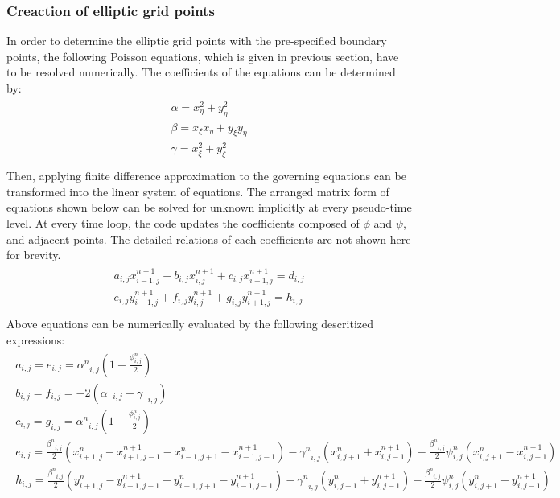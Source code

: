 \documentclass[letterpaper,10pt,english]{sphinxmanual}
\begin{document}
\subsubsection{Creaction of elliptic grid points}
\label{\detokenize{devel:creaction-of-elliptic-grid-points}}
In order to determine the elliptic grid points with the pre-specified boundary points, the following Poisson equations, which is given in previous  section, have to be resolved numerically. The coefficients of the equations can be determined by:
\begin{align*}\!\begin{aligned}
{\alpha}=x_{\eta}^{2} + y_{\eta}^{2}\\
{\beta}=x_{\xi}x_{\eta} + y_{\xi}y_{\eta}\\
{\gamma}=x_{\xi}^{2} + y_{\xi}^{2}\\
\end{aligned}\end{align*}
Then, applying finite difference approximation to the governing equations can be transformed into the linear system of equations. The arranged matrix form of equations shown below can be solved for unknown implicitly at every pseudo-time level. At every time loop, the code updates the coefficients composed of \(\phi\) and \(\psi\), and adjacent points. The detailed relations of each coefficients are not shown here for brevity.
\begin{align*}\!\begin{aligned}
a_{i,j} x_{i-1,j}^{n+1} + b_{i,j} x_{i,j}^{n+1} + c_{i,j} x_{i+1,j}^{n+1} = d_{i,j}\\
e_{i,j} y_{i-1,j}^{n+1} + f_{i,j} y_{i,j}^{n+1} + g_{i,j} y_{i+1,j}^{n+1} = h_{i,j}\\
\end{aligned}\end{align*}
Above equations can be numerically evaluated by the following descritized expressions:
\begin{align*}\!\begin{aligned}
a_{i,j} = e_{i,j} = {\alpha}_{\text{ }i,j}^{n}  \left(1 - \frac{\phi_{i,j}^{n}}{2} \right)\\
b_{i,j} = f_{i,j} = -2 \left({\alpha}_{\text{ }i,j} + {\gamma}_{\text{ }i,j} \right)\\
c_{i,j} = g_{i,j} = {\alpha}_{\text{ }i,j}^{n}  \left(1 + \frac{\phi_{i,j}^{n}}{2} \right)\\
e_{i,j} = \frac{{\beta}_{\text{ }i,j}^{n}}{2} \left(x_{i+1,j}^{n} - x_{i+1,j-1}^{n+1} - x_{i-1,j+1}^{n} - x_{i-1,j-1}^{n+1} \right) - {\gamma}_{\text{ }i,j}^{n} \left( x_{i,j+1}^{n} + x_{i,j-1}^{n+1} \right) - \frac{{\beta}_{\text{ }i,j}^{n}}{2} \psi_{i,j}^{n} \left( x_{i,j+1}^{n} - x_{i,j-1}^{n+1} \right)\\
h_{i,j} = \frac{{\beta}_{\text{ }i,j}^{n}}{2} \left(y_{i+1,j}^{n} - y_{i+1,j-1}^{n+1} - y_{i-1,j+1}^{n} - y_{i-1,j-1}^{n+1} \right) - {\gamma}_{\text{ }i,j}^{n} \left( y_{i,j+1}^{n} + y_{i,j-1}^{n+1} \right) - \frac{{\beta}_{\text{ }i,j}^{n}}{2} \psi_{i,j}^{n} \left( y_{i,j+1}^{n} - y_{i,j-1}^{n+1} \right)\\
\end{aligned}\end{align*}
\end{document}

